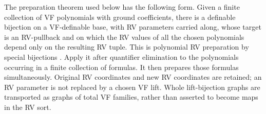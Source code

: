 The preparation theorem used below has the following form. Given a
finite collection of VF polynomials with ground coefficients, there is
a definable bijection on a VF-definable base, with RV parameters carried
along, whose target is an RV-pullback and on which the RV values of all
the chosen polynomials depend only on the resulting RV tuple.
This is polynomial RV preparation by special bijections
\cite[Theorem 5.5]{YinST}. Apply it after quantifier elimination to the
polynomials occurring in a finite collection of formulas. It then
prepares those formulas simultaneously. Original RV coordinates and
new RV coordinates are retained; an RV parameter is not replaced by
a chosen VF lift. Whole lift-bijection graphs are transported as graphs
of total VF families, rather than asserted to become maps in the RV sort.
